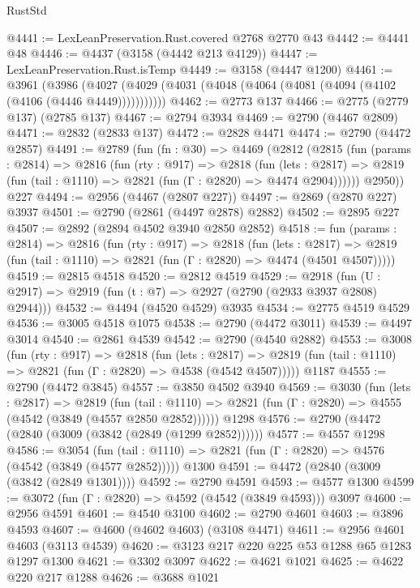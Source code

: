 \begin{lexlean}{RustStd}
\begin{coremodule}
@4441 := LexLeanPreservation.Rust.covered @2768 @2770 @43
@4442 := @4441 @48
@4446 := @4437 (@3158 (@4442 @213 @4129))
@4447 := LexLeanPreservation.Rust.isTemp
@4449 := @3158 (@4447 @1200)
@4461 := @3961
    (@3986 (@4027 (@4029 (@4031 (@4048 (@4064 (@4081 (@4094 (@4102 (@4106 (@4446 @4449)))))))))))
@4462 := @2773 @137
@4466 := @2775 (@2779 @137) (@2785 @137)
@4467 := @2794 @3934
@4469 := @2790 (@4467 @2809)
@4471 := @2832 (@2833 @137)
@4472 := @2828 @4471
@4474 := @2790 (@4472 @2857)
@4491 := @2789
    (fun (fn : @30) =>
    @4469
      (@2812
        (@2815
          (fun (params : @2814) =>
          @2816
            (fun (rty : @917) =>
            @2818
              (fun (lets : @2817) =>
              @2819 (fun (tail : @1110) => @2821 (fun (Γ : @2820) => @4474 @2904))))))
        @2950))
    @227
@4494 := @2956 (@4467 (@2807 @227))
@4497 := @2869 (@2870 @227) @3937
@4501 := @2790 (@2861 (@4497 @2878) @2882)
@4502 := @2895 @227
@4507 := @2892 (@2894 @4502 @3940 @2850 @2852)
@4518 := fun (params : @2814) =>
  @2816
    (fun (rty : @917) =>
    @2818
      (fun (lets : @2817) =>
      @2819 (fun (tail : @1110) => @2821 (fun (Γ : @2820) => @4474 (@4501 @4507)))))
@4519 := @2815 @4518
@4520 := @2812 @4519
@4529 := @2918 (fun (U : @2917) => @2919 (fun (t : @7) => @2927 (@2790 (@2933 @3937 @2808) @2944)))
@4532 := @4494 (@4520 @4529) @3935
@4534 := @2775 @4519 @4529
@4536 := @3005 @4518 @1075
@4538 := @2790 (@4472 @3011)
@4539 := @4497 @3014
@4540 := @2861 @4539
@4542 := @2790 (@4540 @2882)
@4553 := @3008
    (fun (rty : @917) =>
    @2818
      (fun (lets : @2817) =>
      @2819 (fun (tail : @1110) => @2821 (fun (Γ : @2820) => @4538 (@4542 @4507)))))
    @1187
@4555 := @2790 (@4472 @3845)
@4557 := @3850 @4502 @3940
@4569 := @3030
    (fun (lets : @2817) =>
    @2819
      (fun (tail : @1110) => @2821 (fun (Γ : @2820) => @4555 (@4542 (@3849 (@4557 @2850 @2852))))))
    @1298
@4576 := @2790 (@4472 (@2840 (@3009 (@3842 (@2849 (@1299 @2852))))))
@4577 := @4557 @1298
@4586 := @3054
    (fun (tail : @1110) => @2821 (fun (Γ : @2820) => @4576 (@4542 (@3849 (@4577 @2852)))))
    @1300
@4591 := @4472 (@2840 (@3009 (@3842 (@2849 @1301))))
@4592 := @2790 @4591
@4593 := @4577 @1300
@4599 := @3072 (fun (Γ : @2820) => @4592 (@4542 (@3849 @4593))) @3097
@4600 := @2956 @4591
@4601 := @4540 @3100
@4602 := @2790 @4601
@4603 := @3896 @4593
@4607 := @4600 (@4602 @4603) (@3108 @4471)
@4611 := @2956 @4601 @4603 (@3113 @4539)
@4620 := @3123 @217 @220 @225 @53 @1288 @65 @1283 @1297 @1300
@4621 := @3302 @3097
@4622 := @4621 @1021
@4625 := @4622 @220 @217 @1288
@4626 := @3688 @1021

\end{coremodule}
\end{lexlean}
